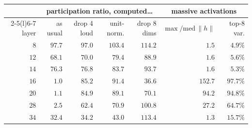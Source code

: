 \begin{tabular}{@{}rrrrrrr@{}}
\toprule
\rowcolor{TableHeader}
& \multicolumn{4}{c}{participation ratio, computed\ldots} & \multicolumn{2}{c}{massive activations} \\
\cmidrule(lr){2-5}\cmidrule(l){6-7}
layer & as usual & drop 4 loud & unit-norm. & drop 8 dims & $\max/\mathrm{med}\,\|h\|$ & top-8 var. \\
\midrule
$8$ & $97.7$ & $97.0$ & $103.4$ & $114.2$ & $1.5$ & $4.9\%$ \\
$12$ & $68.1$ & $70.0$ & $79.4$ & $88.9$ & $1.6$ & $5.6\%$ \\
$14$ & $76.3$ & $76.8$ & $83.7$ & $93.7$ & $1.6$ & $5.3\%$ \\
$16$ & $1.0$ & $85.2$ & $91.4$ & $36.6$ & $152.7$ & $97.7\%$ \\
$20$ & $1.1$ & $84.9$ & $89.1$ & $70.1$ & $94.2$ & $94.8\%$ \\
$28$ & $2.5$ & $62.4$ & $70.9$ & $100.8$ & $27.2$ & $64.7\%$ \\
$34$ & $32.4$ & $34.2$ & $43.0$ & $113.4$ & $1.3$ & $15.7\%$ \\
\bottomrule
\end{tabular}
